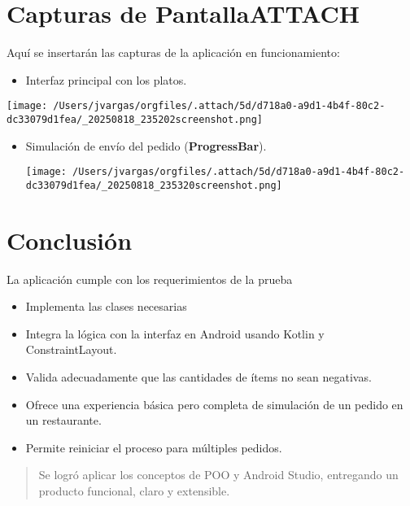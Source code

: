 \documentclass[11pt,a4paper]{article}
\begin{document}
\section{Capturas de Pantalla\hfill{}\textsc{ATTACH}}
\label{sec:org1fd3c39}
Aquí se insertarán las capturas de la aplicación en funcionamiento:

\begin{itemize}
\item Interfaz principal con los platos.
\end{itemize}

\begin{center}
\texttt{[image: /Users/jvargas/orgfiles/.attach/5d/d718a0-a9d1-4b4f-80c2-dc33079d1fea/\_20250818\_235202screenshot.png]}
\end{center}


\begin{itemize}
\item Simulación de envío del pedido (\textbf{ProgressBar}).
\begin{center}
\texttt{[image: /Users/jvargas/orgfiles/.attach/5d/d718a0-a9d1-4b4f-80c2-dc33079d1fea/\_20250818\_235320screenshot.png]}
\end{center}
\end{itemize}
\section{Conclusión}
\label{sec:org7433c29}

La aplicación cumple con los requerimientos de la prueba
\begin{itemize}
\item Implementa las clases necesarias
\item Integra la lógica con la interfaz en Android usando Kotlin y ConstraintLayout.
\item Valida adecuadamente que las cantidades de ítems no sean negativas.
\item Ofrece una experiencia básica pero completa de simulación de un pedido en un restaurante.
\item Permite reiniciar el proceso para múltiples pedidos.
\end{itemize}

\begin{quote}
Se logró aplicar los conceptos de POO y Android Studio, entregando un producto funcional, claro y extensible.
\end{quote}
\end{document}
